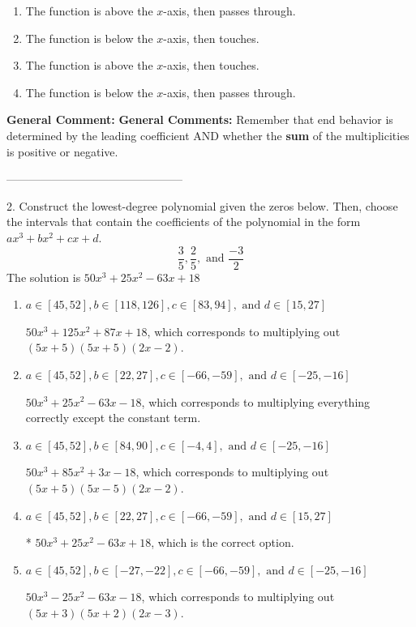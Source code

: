 \documentclass{extbook}[14pt]
\begin{document}
\begin{enumerate}[label=\Alph*.] 
\item The function is above the $x$-axis, then passes through.  
\item The function is below the $x$-axis, then touches.  
\item The function is above the $x$-axis, then touches.  
\item The function is below the $x$-axis, then passes through.  
\end{enumerate} 
 
\textbf{General Comment:} \textbf{General Comments:} Remember that end behavior is determined by the leading coefficient AND whether the \textbf{sum} of the multiplicities is positive or negative. 

-----------------------------------------------

2. Construct the lowest-degree polynomial given the zeros below. Then, choose the intervals that contain the coefficients of the polynomial in the form $ax^3+bx^2+cx+d$.
\[ \frac{3}{5}, \frac{2}{5}, \text{ and } \frac{-3}{2} \] 
The solution is $ 50x^{3} +25 x^{2} -63 x + 18 $ 

\begin{enumerate}[label=\Alph*.] 
\item $ a \in [45, 52], b \in [118, 126], c \in [83, 94], \text{ and } d \in [15, 27] $ 

 $50x^{3} +125 x^{2} +87 x + 18$, which corresponds to multiplying out $(5x + 5)(5x + 5)(2x -2)$. 
\item $ a \in [45, 52], b \in [22, 27], c \in [-66, -59], \text{ and } d \in [-25, -16] $ 

 $50x^{3} +25 x^{2} -63 x -18$, which corresponds to multiplying everything correctly except the constant term. 
\item $ a \in [45, 52], b \in [84, 90], c \in [-4, 4], \text{ and } d \in [-25, -16] $ 

 $50x^{3} +85 x^{2} +3 x -18$, which corresponds to multiplying out $(5x + 5)(5x -5)(2x -2)$. 
\item $ a \in [45, 52], b \in [22, 27], c \in [-66, -59], \text{ and } d \in [15, 27] $ 

 * $50x^{3} +25 x^{2} -63 x + 18$, which is the correct option. 
\item $ a \in [45, 52], b \in [-27, -22], c \in [-66, -59], \text{ and } d \in [-25, -16] $ 

 $50x^{3} -25 x^{2} -63 x -18$, which corresponds to multiplying out $(5x + 3)(5x + 2)(2x -3)$. 
\end{enumerate} 
 
\end{document}
